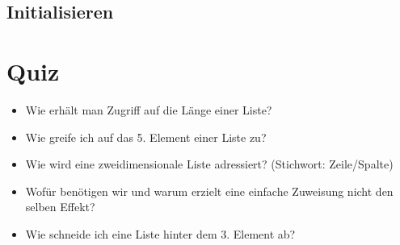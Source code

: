\subsection{Initialisieren}
\begin{frame}
    \slidehead
\end{frame}

\livecoding

\section{Quiz}
\begin{frame}
    \slidehead
    \begin{itemize}
        \item Wie erhält man Zugriff auf die Länge einer Liste?
            \pause
        \item Wie greife ich auf das 5. Element einer Liste zu?
            \pause
        \item Wie wird eine zweidimensionale Liste adressiert? (Stichwort: Zeile/Spalte)
            \pause
        \item Wofür benötigen wir  und warum erzielt eine einfache Zuweisung nicht den selben Effekt?
            \pause
        \item Wie schneide ich eine Liste hinter dem 3. Element ab?
    \end{itemize}
\end{frame}




